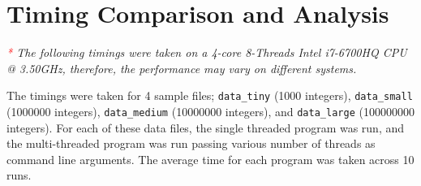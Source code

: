 \documentclass{article}
\theoremstyle{mytheoremstyle}
\theoremstyle{mytheoremstyle}
\theoremstyle{myproblemstyle}
\begin{document}

\newpage
\section{Timing Comparison and Analysis}
\begin{mdframed}[backgroundcolor=shallowBlue]
  \textit{\textcolor{red}{*} The following timings were taken on a 4-core 8-Threads Intel i7-6700HQ CPU @ 3.50GHz, therefore, the performance may vary on different systems.}
\end{mdframed}

The timings were taken for 4 sample files; \texttt{data\_tiny} (1000 integers), \texttt{data\_small} (1000000 integers), \texttt{data\_medium} (10000000 integers), and \texttt{data\_large} (100000000 integers). For each of these data files, the single threaded program was run, and the multi-threaded program was run passing various number of threads as command line arguments. The average time for each program was taken across 10 runs.
\end{document}
